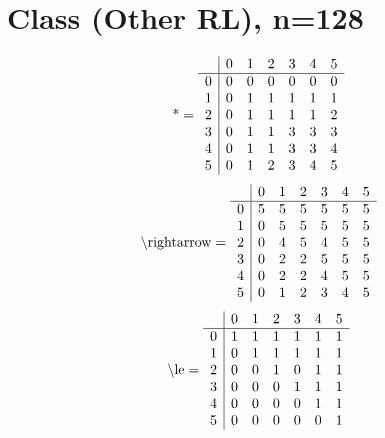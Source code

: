 \documentclass[11pt]{article}
\begin{document}
\section{Class (Other RL), n=128}
\[\text{*} = 
\begin{array}{r | r r r r r r}
 & 0 & 1 & 2 & 3 & 4 & 5 \\ \hline
0 & 0 & 0 & 0 & 0 & 0 & 0 \\
1 & 0 & 1 & 1 & 1 & 1 & 1 \\
2 & 0 & 1 & 1 & 1 & 1 & 2 \\
3 & 0 & 1 & 1 & 3 & 3 & 3 \\
4 & 0 & 1 & 1 & 3 & 3 & 4 \\
5 & 0 & 1 & 2 & 3 & 4 & 5 \\
\end{array}
\]
\[\text{\textbackslash rightarrow} = 
\begin{array}{r | r r r r r r}
 & 0 & 1 & 2 & 3 & 4 & 5 \\ \hline
0 & 5 & 5 & 5 & 5 & 5 & 5 \\
1 & 0 & 5 & 5 & 5 & 5 & 5 \\
2 & 0 & 4 & 5 & 4 & 5 & 5 \\
3 & 0 & 2 & 2 & 5 & 5 & 5 \\
4 & 0 & 2 & 2 & 4 & 5 & 5 \\
5 & 0 & 1 & 2 & 3 & 4 & 5 \\
\end{array}
\]
\[\text{\textbackslash le} = 
\begin{array}{r | r r r r r r}
 & 0 & 1 & 2 & 3 & 4 & 5 \\ \hline
0 & 1 & 1 & 1 & 1 & 1 & 1 \\
1 & 0 & 1 & 1 & 1 & 1 & 1 \\
2 & 0 & 0 & 1 & 0 & 1 & 1 \\
3 & 0 & 0 & 0 & 1 & 1 & 1 \\
4 & 0 & 0 & 0 & 0 & 1 & 1 \\
5 & 0 & 0 & 0 & 0 & 0 & 1 \\
\end{array}
\]
\end{document}
